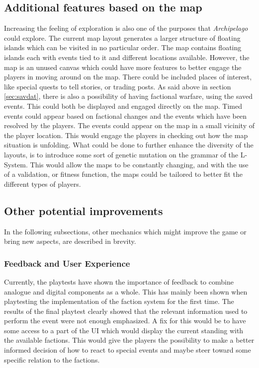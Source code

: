 \subsection{Additional features based on the map}
Increasing the feeling of exploration is also one of the purposes that \textit{Archipelago} could explore. The current map layout generates a larger structure of floating islands which can be visited in no particular order. The map contains floating islands each with events tied to it and different locations available. However, the map is an unused canvas which could have more features to better engage the players in moving around on the map. 
There could be included places of interest, like special quests to tell stories, or trading posts.
As said above in section \ref{sec:savdat}, there is also a possibility of having factional warfare, using the saved events. This could both be displayed and engaged directly on the map. Timed events could appear based on factional changes and the events which have been resolved by the players. The events could appear on the map in a small vicinity of the player location. This would engage the players in checking out how the map situation is unfolding. What could be done to further enhance the diversity of the layouts, is to introduce some sort of genetic mutation on the grammar of the L-System. This would allow the maps to be constantly changing, and with the use of a validation, or fitness function, the maps could be tailored to better fit the different types of players.


\subsection{Other potential improvements}
In the following subsections, other mechanics which might improve the game or bring new aspects, are described in brevity. 
\subsubsection{Feedback and User Experience}
Currently, the playtests have shown the importance of feedback to combine analogue and digital components as a whole. This has mainly been shown when playtesting the implementation of the faction system for the first time. The results of the final playtest clearly showed that the relevant information used to perform the event were not enough emphasized.
A fix for this would be to have some access to a part of the UI which would display the current standing with the available factions. This would give the players the possibility to make a better informed decision of how to react to special events and maybe steer toward some specific relation to the factions.



